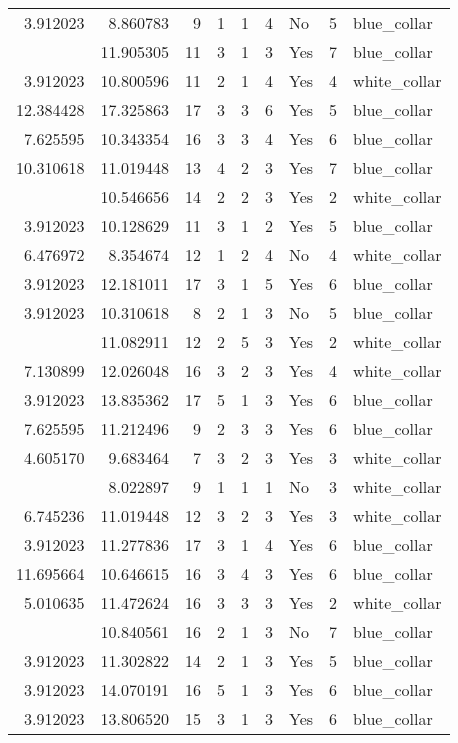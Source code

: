 \documentclass[
]{article}
\begin{document}
\begin{longtable}[t]{rrrrrllrl}
3.912023 & 8.860783 & 9 & 1 & 1 & 4 & No & 5 & blue\_collar\\
\addlinespace
3.912023 & 11.905305 & 11 & 3 & 1 & 3 & Yes & 7 & blue\_collar\\
3.912023 & 10.800596 & 11 & 2 & 1 & 4 & Yes & 4 & white\_collar\\
12.384428 & 17.325863 & 17 & 3 & 3 & 6 & Yes & 5 & blue\_collar\\
7.625595 & 10.343354 & 16 & 3 & 3 & 4 & Yes & 6 & blue\_collar\\
10.310618 & 11.019448 & 13 & 4 & 2 & 3 & Yes & 7 & blue\_collar\\
\addlinespace
4.605170 & 10.546656 & 14 & 2 & 2 & 3 & Yes & 2 & white\_collar\\
3.912023 & 10.128629 & 11 & 3 & 1 & 2 & Yes & 5 & blue\_collar\\
6.476972 & 8.354674 & 12 & 1 & 2 & 4 & No & 4 & white\_collar\\
3.912023 & 12.181011 & 17 & 3 & 1 & 5 & Yes & 6 & blue\_collar\\
3.912023 & 10.310618 & 8 & 2 & 1 & 3 & No & 5 & blue\_collar\\
\addlinespace
8.022897 & 11.082911 & 12 & 2 & 5 & 3 & Yes & 2 & white\_collar\\
7.130899 & 12.026048 & 16 & 3 & 2 & 3 & Yes & 4 & white\_collar\\
3.912023 & 13.835362 & 17 & 5 & 1 & 3 & Yes & 6 & blue\_collar\\
7.625595 & 11.212496 & 9 & 2 & 3 & 3 & Yes & 6 & blue\_collar\\
4.605170 & 9.683464 & 7 & 3 & 2 & 3 & Yes & 3 & white\_collar\\
\addlinespace
3.912023 & 8.022897 & 9 & 1 & 1 & 1 & No & 3 & white\_collar\\
6.745236 & 11.019448 & 12 & 3 & 2 & 3 & Yes & 3 & white\_collar\\
3.912023 & 11.277836 & 17 & 3 & 1 & 4 & Yes & 6 & blue\_collar\\
11.695664 & 10.646615 & 16 & 3 & 4 & 3 & Yes & 6 & blue\_collar\\
5.010635 & 11.472624 & 16 & 3 & 3 & 3 & Yes & 2 & white\_collar\\
\addlinespace
3.912023 & 10.840561 & 16 & 2 & 1 & 3 & No & 7 & blue\_collar\\
3.912023 & 11.302822 & 14 & 2 & 1 & 3 & Yes & 5 & blue\_collar\\
3.912023 & 14.070191 & 16 & 5 & 1 & 3 & Yes & 6 & blue\_collar\\
3.912023 & 13.806520 & 15 & 3 & 1 & 3 & Yes & 6 & blue\_collar\\

\end{longtable}
\end{document}
